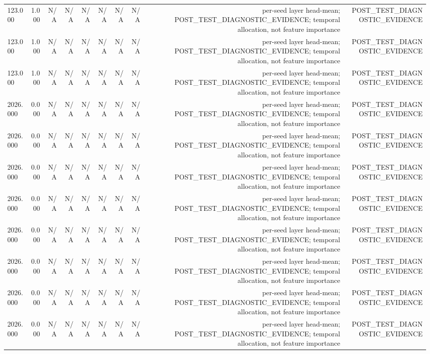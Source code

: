 \begin{table}[h!]
\begin{tabular}{lrrrrrrrrr}
123.000 & 1.000 & N/A & N/A & N/A & N/A & N/A & N/A & per-seed layer head-mean; POST\_TEST\_DIAGNOSTIC\_EVIDENCE; temporal allocation, not feature importance & POST\_TEST\_DIAGNOSTIC\_EVIDENCE \\
123.000 & 1.000 & N/A & N/A & N/A & N/A & N/A & N/A & per-seed layer head-mean; POST\_TEST\_DIAGNOSTIC\_EVIDENCE; temporal allocation, not feature importance & POST\_TEST\_DIAGNOSTIC\_EVIDENCE \\
123.000 & 1.000 & N/A & N/A & N/A & N/A & N/A & N/A & per-seed layer head-mean; POST\_TEST\_DIAGNOSTIC\_EVIDENCE; temporal allocation, not feature importance & POST\_TEST\_DIAGNOSTIC\_EVIDENCE \\
2026.000 & 0.000 & N/A & N/A & N/A & N/A & N/A & N/A & per-seed layer head-mean; POST\_TEST\_DIAGNOSTIC\_EVIDENCE; temporal allocation, not feature importance & POST\_TEST\_DIAGNOSTIC\_EVIDENCE \\
2026.000 & 0.000 & N/A & N/A & N/A & N/A & N/A & N/A & per-seed layer head-mean; POST\_TEST\_DIAGNOSTIC\_EVIDENCE; temporal allocation, not feature importance & POST\_TEST\_DIAGNOSTIC\_EVIDENCE \\
2026.000 & 0.000 & N/A & N/A & N/A & N/A & N/A & N/A & per-seed layer head-mean; POST\_TEST\_DIAGNOSTIC\_EVIDENCE; temporal allocation, not feature importance & POST\_TEST\_DIAGNOSTIC\_EVIDENCE \\
2026.000 & 0.000 & N/A & N/A & N/A & N/A & N/A & N/A & per-seed layer head-mean; POST\_TEST\_DIAGNOSTIC\_EVIDENCE; temporal allocation, not feature importance & POST\_TEST\_DIAGNOSTIC\_EVIDENCE \\
2026.000 & 0.000 & N/A & N/A & N/A & N/A & N/A & N/A & per-seed layer head-mean; POST\_TEST\_DIAGNOSTIC\_EVIDENCE; temporal allocation, not feature importance & POST\_TEST\_DIAGNOSTIC\_EVIDENCE \\
2026.000 & 0.000 & N/A & N/A & N/A & N/A & N/A & N/A & per-seed layer head-mean; POST\_TEST\_DIAGNOSTIC\_EVIDENCE; temporal allocation, not feature importance & POST\_TEST\_DIAGNOSTIC\_EVIDENCE \\
2026.000 & 0.000 & N/A & N/A & N/A & N/A & N/A & N/A & per-seed layer head-mean; POST\_TEST\_DIAGNOSTIC\_EVIDENCE; temporal allocation, not feature importance & POST\_TEST\_DIAGNOSTIC\_EVIDENCE \\
2026.000 & 0.000 & N/A & N/A & N/A & N/A & N/A & N/A & per-seed layer head-mean; POST\_TEST\_DIAGNOSTIC\_EVIDENCE; temporal allocation, not feature importance & POST\_TEST\_DIAGNOSTIC\_EVIDENCE \\

\end{tabular}
\end{table}
